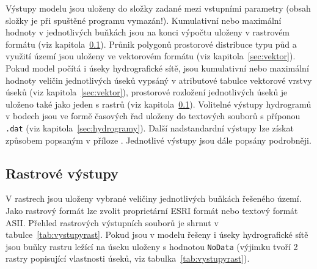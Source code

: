 


Výstupy modelu jsou uloženy do složky zadané mezi vstupními parametry (obsah složky je při spuštěné programu vymazán!). Kumulativní nebo maximální hodnoty v jednotlivých  buňkách jsou na konci výpočtu uloženy v rastrovém formátu (viz kapitola~\ref{sec:rastr}). Průnik polygonů prostorové distribuce typu půd a využití území jsou uloženy ve vektorovém formátu (viz kapitola~\ref{sec:vektor}). Pokud model \smod počítá i úseky hydrografické sítě, jsou kumulativní nebo maximální hodnoty veličin jednotlivých úseků vypsáný v atributové tabulce vektorové vrstvy úseků (viz kapitola~\ref{sec:vektor}), prostorové rozložení jednotlivých úseků je uloženo také jako jeden s rastrů (viz kapitola~\ref{sec:rastr}).  Volitelné výstupy hydrogramů  v bodech jsou ve formě časových řad uloženy do textových souborů s příponou {\tt.dat} (viz kapitola~\ref{sec:hydrogramy}). Další nadstandardní výstupy lze získat způsobem popsaným v příloze . Jednotlivé výstupy jsou dále popsány podrobněji. 













\subsection{Rastrové výstupy}\label{sec:rastr}

V rastrech jsou uloženy vybrané veličiny jednotlivých buňkách řešeného území. Jako rastrový formát lze zvolit proprietární ESRI formát nebo textový formát ASII. Přehled rastrových výstupních souborů je shrnut v tabulce~\ref{tab:vystupyrast}. Pokud jsou v modelu řešeny i úseky hydrografické sítě jsou buňky rastru ležící na úseku uloženy s hodnotou {\tt NoData} (výjimku tvoří 2 rastry popisující vlastnosti úseků, viz tabulka~\ref{tab:vystupyrast}).  










